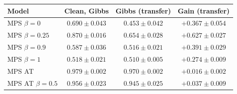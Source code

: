 \begin{tabular}{lccc}
\toprule
Model & Clean, Gibbs & Gibbs (transfer) & Gain (transfer) \\
\midrule
MPS $\beta=0$ & $0.690 \pm 0.043$ & $0.453 \pm 0.042$ & $+0.367 \pm 0.054$ \\
MPS $\beta=0.25$ & $0.870 \pm 0.016$ & $0.654 \pm 0.028$ & $+0.627 \pm 0.027$ \\
MPS $\beta=0.9$ & $0.587 \pm 0.036$ & $0.516 \pm 0.021$ & $+0.391 \pm 0.029$ \\
MPS $\beta=1$ & $0.518 \pm 0.021$ & $0.510 \pm 0.005$ & $+0.274 \pm 0.009$ \\
MPS AT & $0.979 \pm 0.002$ & $\mathbf{0.970 \pm 0.002}$ & $+0.016 \pm 0.002$ \\
MPS AT $\beta=0.5$ & $0.956 \pm 0.023$ & $0.945 \pm 0.025$ & $+0.037 \pm 0.009$ \\
\bottomrule
\end{tabular}
